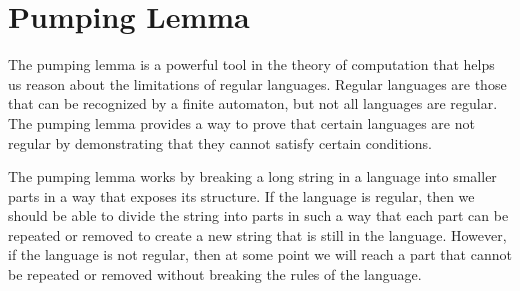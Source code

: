 \documentclass[12pt]{report}
\begin{document}
\section{Pumping Lemma}
The pumping lemma is a powerful tool in the theory of computation that helps us reason about the limitations of regular languages. Regular languages are those that can be recognized by a finite automaton, but not all languages are regular. The pumping lemma provides a way to prove that certain languages are not regular by demonstrating that they cannot satisfy certain conditions.

The pumping lemma works by breaking a long string in a language into smaller parts in a way that exposes its structure. If the language is regular, then we should be able to divide the string into parts in such a way that each part can be repeated or removed to create a new string that is still in the language. However, if the language is not regular, then at some point we will reach a part that cannot be repeated or removed without breaking the rules of the language.


\end{document}
